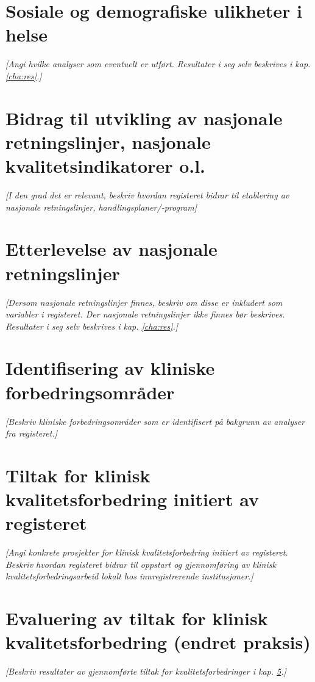 \documentclass[norsk, a4paper, twocolumn]{report}
\newcommand{\guide}[1] {
	\textit{[\textcolor{guidegray}{#1}]}
	}
\begin{document}
\section{Sosiale og demografiske ulikheter i helse}\label{sec:sosdem}
\guide{Angi hvilke analyser som eventuelt er utført. Resultater i seg selv
beskrives i kap. \ref{cha:res}.}

\section{Bidrag til utvikling av nasjonale retningslinjer, nasjonale
kvalitetsindikatorer o.l.}\label{sec:retut}
\guide{I den grad det er relevant, beskriv hvordan registeret bidrar til
etablering av nasjonale retningslinjer, handlingsplaner/-program}

\section{Etterlevelse av nasjonale retningslinjer}\label{sec:retbru}
\guide{Dersom nasjonale retningslinjer finnes, beskriv om disse er inkludert
som variabler i registeret. Der nasjonale retningslinjer ikke finnes bør
\normalfont{best practice}
\textit{beskrives. Resultater i seg selv beskrives i kap. \ref{cha:res}.}}

\section{Identifisering av kliniske forbedringsområder}\label{sec:ide}
\guide{Beskriv kliniske forbedringsområder som er identifisert på bakgrunn
av analyser fra registeret.}

\section{Tiltak for klinisk kvalitetsforbedring initiert av
registeret}\label{sec:brures}
\guide{Angi konkrete prosjekter
for klinisk kvalitetsforbedring initiert av registeret. Beskriv
hvordan registeret bidrar til oppstart og gjennomføring
av klinisk kvalitetsforbedringsarbeid lokalt hos innregistrerende
institusjoner.}

\section{Evaluering av tiltak for klinisk kvalitetsforbedring (endret praksis)}\label{sec:evakva}
\guide{Beskriv resultater av gjennomførte tiltak for kvalitetsforbedringer
i kap. \ref{sec:brures}.}
\end{document}
